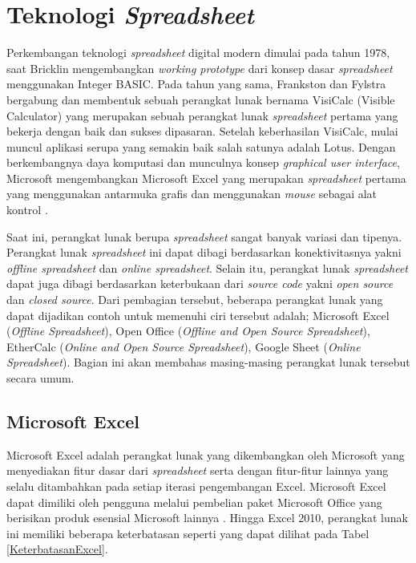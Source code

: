 \section{Teknologi \textit{Spreadsheet}}
Perkembangan teknologi \textit{spreadsheet} digital modern dimulai pada tahun 1978, saat Bricklin mengembangkan \textit{working prototype} dari konsep dasar \textit{spreadsheet} menggunakan Integer BASIC. Pada tahun yang sama, Frankston dan Fylstra bergabung dan membentuk sebuah perangkat lunak bernama VisiCalc (Visible Calculator) yang merupakan sebuah perangkat lunak \textit{spreadsheet} pertama yang bekerja dengan baik dan sukses dipasaran. Setelah keberhasilan VisiCalc, mulai muncul aplikasi serupa yang semakin baik salah satunya adalah Lotus. Dengan berkembangnya daya komputasi dan munculnya konsep \textit{graphical user interface}, Microsoft mengembangkan Microsoft Excel yang merupakan \textit{spreadsheet} pertama yang menggunakan antarmuka grafis dan menggunakan \textit{mouse} sebagai alat kontrol \parencite{power2004brief}.

Saat ini, perangkat lunak berupa \textit{spreadsheet} sangat banyak variasi dan tipenya. Perangkat lunak \textit{spreadsheet} ini dapat dibagi berdasarkan konektivitasnya yakni \textit{offline spreadsheet} dan \textit{online spreadsheet}. Selain itu, perangkat lunak \textit{spreadsheet} dapat juga dibagi berdasarkan keterbukaan dari \textit{source code} yakni \textit{open source} dan \textit{closed source}. Dari pembagian tersebut, beberapa perangkat lunak yang dapat dijadikan contoh untuk memenuhi ciri tersebut adalah; Microsoft Excel (\textit{Offline Spreadsheet}), Open Office (\textit{Offline and Open Source Spreadsheet}), EtherCalc (\textit{Online and Open Source Spreadsheet}), Google Sheet (\textit{Online Spreadsheet}). Bagian ini akan membahas masing-masing perangkat lunak tersebut secara umum.

    \subsection{Microsoft Excel}
    Microsoft Excel adalah perangkat lunak yang dikembangkan oleh Microsoft yang menyediakan fitur dasar dari \textit{spreadsheet} serta dengan fitur-fitur lainnya yang selalu ditambahkan pada setiap iterasi pengembangan Excel. Microsoft Excel dapat dimiliki oleh pengguna melalui pembelian paket Microsoft Office yang berisikan produk esensial Microsoft lainnya \parencite{MSExcelProduct}. Hingga Excel 2010, perangkat lunak ini memiliki beberapa keterbatasan seperti yang dapat dilihat pada Tabel \ref{KeterbatasanExcel}.

